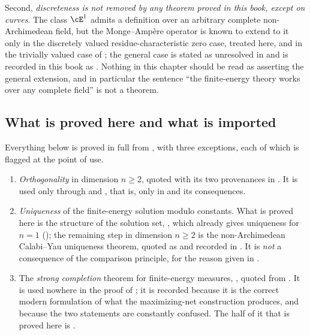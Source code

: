 Second, \emph{discreteness is not removed by any theorem proved in this
book, except on curves}.  The class $\cE^1$ admits a definition over an
arbitrary complete non-Archimedean field, but the Monge--Amp\`ere operator
is known to extend to it only in the discretely valued residue-characteristic
zero case, treated here, and in the trivially valued case of
; the general case is stated as unresolved in
\cite[Remark~4.4]{PS23Hybrid} and is recorded in this book as
.  Nothing in this chapter should be read as
asserting the general extension, and in particular the sentence ``the
finite-energy theory works over any complete field'' is not a theorem.

\subsection{What is proved here and what is imported}
\label{sec:ch28-imported}

Everything below is proved in full from
,
with three exceptions, each of which is flagged at the point of use.

\begin{enumerate}
\item[\textup{(I1)}]
\emph{Orthogonality} in dimension $n\geq2$, quoted with its two
provenances in .  It is used only through
 and , that
is, only in  and its consequences.
\item[\textup{(I2)}]
\emph{Uniqueness} of the finite-energy solution modulo constants.  What is
proved here is the structure of the solution set,
, which already gives uniqueness for $n=1$
(); the remaining step in dimension
$n\geq2$ is the non-Archimedean Calabi--Yau uniqueness theorem, quoted as
\cite[Proposition~8.2]{BFJ15} and recorded in
.  It is \emph{not} a consequence
of the comparison principle, for the reason given in
.
\item[\textup{(I3)}]
The \emph{strong completion} theorem for finite-energy measures,
, quoted from
\cite{BJ25FiniteEnergy}.  It is used nowhere in the proof of
; it is recorded because it is the correct modern
formulation of what the maximizing-net construction produces, and because
the two statements are constantly confused.  The half of it that is proved
here is .
\end{enumerate}

